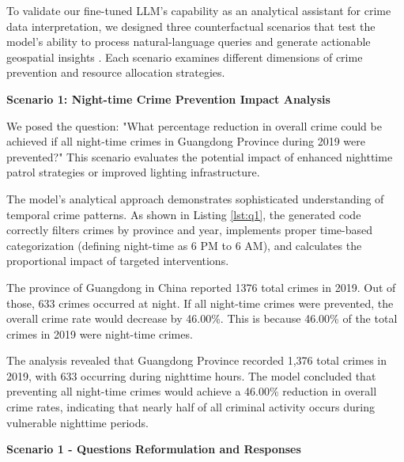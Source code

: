 To validate our fine-tuned LLM's capability as an analytical assistant for crime data interpretation, we designed three counterfactual scenarios that test the model's ability to process natural-language queries and generate actionable geospatial insights \cite{William2025}. Each scenario examines different dimensions of crime prevention and resource allocation strategies.



\noindent \textbf{Scenario 1: Night-time Crime Prevention Impact Analysis}

We posed the question: "What percentage reduction in overall crime could be achieved if all night-time crimes in Guangdong Province during 2019 were prevented?" This scenario evaluates the potential impact of enhanced nighttime patrol strategies or improved lighting infrastructure.

The model's analytical approach demonstrates sophisticated understanding of temporal crime patterns. As shown in Listing \ref{lst:q1}, the generated code correctly filters crimes by province and year, implements proper time-based categorization (defining night-time as 6 PM to 6 AM), and calculates the proportional impact of targeted interventions.



\begin{tcolorbox}[colback=white!95!black, colframe=black, title=Q1 Response, fontupper=\scriptsize, boxsep=2pt, left=3pt, right=3pt]
  The province of Guangdong in China reported 1376 total crimes in 2019. Out of those, 633 crimes occurred at night. If all night-time crimes were prevented, the overall crime rate would decrease by 46.00\%. This is because 46.00\% of the total crimes in 2019 were night-time crimes.
\end{tcolorbox}

The analysis revealed that Guangdong Province recorded 1,376 total crimes in 2019, with 633 occurring during nighttime hours. The model concluded that preventing all night-time crimes would achieve a 46.00\% reduction in overall crime rates, indicating that nearly half of all criminal activity occurs during vulnerable nighttime periods.


\noindent \textbf{Scenario 1 - Questions Reformulation and Responses}

